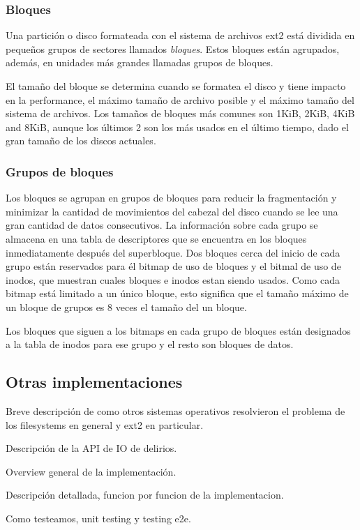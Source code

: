 \subsubsection{Bloques}
Una partición o disco formateada con el sistema de archivos ext2 está dividida en pequeños grupos de sectores llamados \emph{bloques}. Estos bloques están agrupados, además, en unidades más grandes llamadas grupos de bloques.

El tamaño del bloque se determina cuando se formatea el disco y tiene impacto en la performance, el máximo tamaño de archivo posible y el máximo tamaño del sistema de archivos. Los tamaños de bloques más comunes son 1KiB, 2KiB, 4KiB and 8KiB, aunque los últimos 2 son los más usados en el último tiempo, dado el gran tamaño de los discos actuales.

\subsubsection{Grupos de bloques}

Los bloques se agrupan en grupos de bloques para reducir la fragmentación y minimizar la cantidad de movimientos del cabezal del disco cuando se lee una gran cantidad de datos consecutivos. La información sobre cada grupo se almacena en una tabla de descriptores que se encuentra en los bloques inmediatamente después del superbloque. 
Dos bloques cerca del inicio de cada grupo están reservados para \'el bitmap de uso de bloques y el bitmal de uso de inodos, que muestran cuales bloques e inodos estan siendo usados.
Como cada bitmap está limitado a un único bloque, esto significa que el tamaño máximo de un bloque de grupos es 8 veces el tamaño del un bloque.

Los bloques que siguen a los bitmaps en cada grupo de bloques están designados a la tabla de inodos para ese grupo y el resto son bloques de datos.


\subsection{Otras implementaciones}
\begin{puntos}
  \item Breve descripción de como otros sistemas operativos resolvieron el problema de los filesystems en general y ext2 en particular.
\end{puntos}



\begin{puntos}
  \item Descripción de la API de IO de delirios.
  \item Overview general de la implementación.
  \item Descripción detallada, funcion por funcion de la implementacion.
  \item Como testeamos, unit testing y testing e2e.
\end{puntos}

